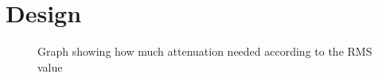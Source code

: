 \section{Design}

\begin{figure}[H]
\centering
{}

\caption{Graph showing how much attenuation needed according to the RMS value}
\label{fig:SystemOverview}
\end{figure}